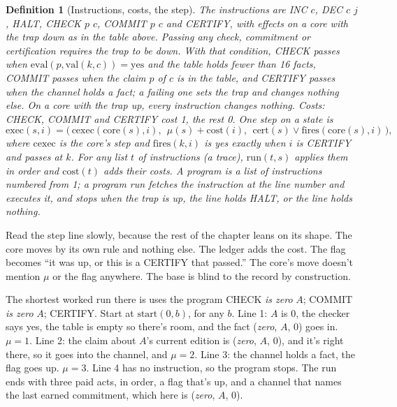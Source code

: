 \documentclass[11pt,twoside]{article}
\theoremstyle{thielethm}
\theoremstyle{thieledef}
\newtheorem{definition}{Definition}[section]
\theoremstyle{thieledef}
\theoremstyle{thieledef}
\theoremstyle{thielethm}
\theoremstyle{thieleobs}
\theoremstyle{thielethm}
\begin{document}
\begin{definition}[Instructions, costs, the step]\label{def:u34-step}
The instructions are INC $c$, DEC $c$ $j$, HALT, CHECK $p$ $c$, COMMIT $p$ $c$ and
CERTIFY, with effects on a core with the trap down as in the table above. Passing any
check, commitment or certification requires the trap to be down. With that condition, CHECK
passes when $\mathrm{eval}(p, \mathrm{val}(k, c)) = \mathrm{yes}$ and the table holds fewer
than 16 facts, COMMIT passes when the claim $p$ of $c$ is in the table, and CERTIFY passes
when the channel holds a fact; a failing one sets the trap and changes nothing else. On a
core with the trap up, every instruction changes nothing. Costs: CHECK, COMMIT and CERTIFY
cost 1, the rest 0. One step on a state is
\[
\mathrm{exec}(s, i) = \big(\,\mathrm{cexec}(\mathrm{core}(s), i),\ \ \mu(s) + \mathrm{cost}(i),\ \ \mathrm{cert}(s) \lor \mathrm{fires}(\mathrm{core}(s), i)\,\big),
\]
where $\mathrm{cexec}$ is the core's step and $\mathrm{fires}(k, i)$ is yes exactly when
$i$ is CERTIFY and passes at $k$. For any list $t$ of instructions (a \emph{trace}),
$\mathrm{run}(t, s)$ applies them in order and $\mathrm{cost}(t)$ adds their costs. A
\emph{program} is a list of instructions numbered from 1; a program run fetches the instruction
at the line number and executes it, and stops when the trap is up, the line holds HALT, or
the line holds nothing.
\end{definition}

Read the step line slowly, because the rest of the chapter leans on its shape. The core
moves by its own rule and nothing else. The ledger adds the cost. The flag becomes ``it was
up, or this is a CERTIFY that passed.'' The core's move doesn't mention $\mu$ or the flag
anywhere. The base is blind to the record by construction.

The shortest worked run there is uses the program CHECK \emph{is zero} $A$; COMMIT \emph{is
zero} $A$; CERTIFY. Start at $\mathrm{start}(0, b)$, for any $b$. Line 1: $A$ is 0, the checker
says yes, the table is empty so there's room, and the fact (\emph{zero}, $A$, 0) goes in.
$\mu = 1$. Line 2: the claim about $A$'s current edition is (\emph{zero}, $A$, 0), and it's
right there, so it goes into the channel, and $\mu = 2$. Line 3: the channel holds a fact, the flag goes up.
$\mu = 3$. Line 4 has no instruction, so the program stops. The run ends with three paid acts, in order, a flag
that's up, and a channel that names the last earned commitment, which here is (\emph{zero},
$A$, 0).
\end{document}
